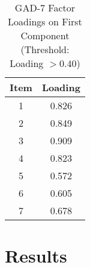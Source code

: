 \documentclass{article}
\begin{document}
\vspace{0.5cm}

\begin{table}[H]
\centering
\caption{GAD-7 Factor Loadings on First Component (Threshold: Loading $> 0.40$)}
\begin{tabular}{|c|c|}
\hline
\textbf{Item} & \textbf{Loading} \\
\hline
1 & 0.826 \\
2 & 0.849 \\
3 & 0.909 \\
4 & 0.823 \\
5 & 0.572 \\
6 & 0.605 \\
7 & 0.678 \\
\hline
\end{tabular}
\end{table}


\section{Results}
\end{document}
